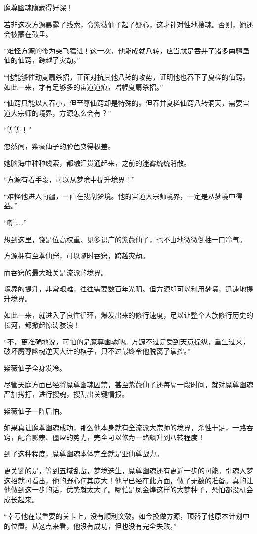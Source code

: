 \begin{this_body}
魔尊幽魂隐藏得好深！

若非这次方源暴露了线索，令紫薇仙子起了疑心，这才针对性地搜魂。否则，她还会被蒙在鼓里。

“难怪方源的修为突飞猛进！这一次，他能成就八转，应当就是吞并了诸多南疆蛊仙的仙窍，跨越了灾劫。”

“他能够催动夏扇杀招，正面对抗其他八转的攻势，证明他也吞下了夏槎的仙窍。如此一来，才有足够多的宙道道痕，增幅夏扇杀招。”

“仙窍只能以大吞小，但至尊仙窍却是特殊的。但吞并夏槎仙窍八转洞天，需要宙道大宗师的境界，方源怎么会有？”

“等等！”

忽然间，紫薇仙子的脸色变得极差。

她脑海中种种线索，都融汇贯通起来，之前的迷雾统统消散。

“方源有着手段，可以从梦境中提升境界！”

“难怪他进入南疆，一直在搜刮梦境。他的宙道大宗师境界，一定是从梦境中得益。”

“嘶……”

想到这里，饶是位高权重、见多识广的紫薇仙子，也不由地微微倒抽一口冷气。

方源拥有至尊仙窍，可以随时吞窍，跨越灾劫。

而吞窍的最大难关是流派的境界。

境界的提升，非常艰难，往往需要数百年光阴。但方源却可以利用梦境，迅速地提升境界。

如此一来，就进入了良性循环，爆发出来的修行速度，足以让整个人族修行历史的长河，都掀起惊涛骇浪！

“不，更准确地说，可怕的是魔尊幽魂呐。方源不过是受到天意操纵，重生过来，破坏魔尊幽魂逆天大计的棋子，只不过最终令他脱离了掌控。”

紫薇仙子全身发冷。

尽管天庭方面已经将魔尊幽魂囚禁，甚至紫薇仙子还每隔一段时间，就对魔尊幽魂严加拷打，进行搜魂，搜刮出关键情报。

紫薇仙子一阵后怕。

如果真让魔尊幽魂成功，那么他本身就有全流派大宗师的境界，杀性十足，一路吞窍，配合影宗、僵盟的势力，完全可以修为一路飙升到八转程度！

到了这种程度，魔尊幽魂本体完全就是亚仙尊战力。

更关键的是，等到五域乱战，梦境迭生，魔尊幽魂还有更近一步的可能。引魂入梦这招就可看出，他的野心何其庞大！他早已经在此方面，做了无数的准备。真的让他做到这一步的话，优势就太大了。哪怕是凤金煌这样的大梦种子，恐怕都没机会成长起来。

“幸亏他在最重要的关卡上，没有顺利突破。如今换做方源，顶替了他原本计划中的位置。从这点来看，他没有成功，但也没有完全失败。”


\end{this_body}
